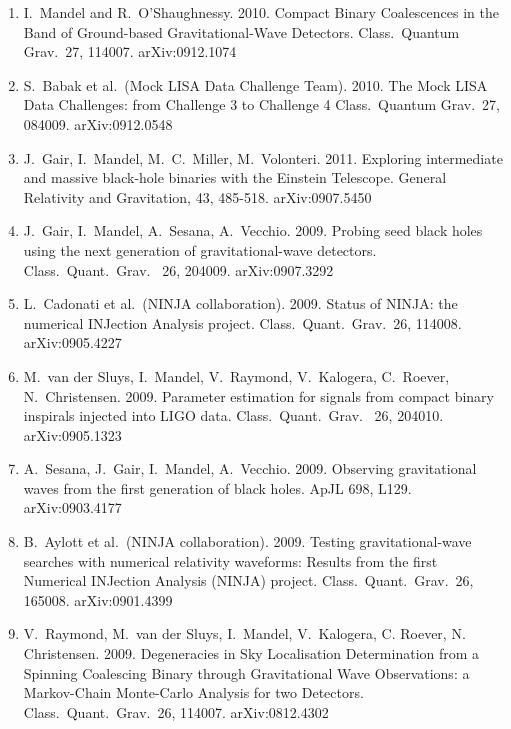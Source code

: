 \documentclass[margin,line]{res}
\begin{document}
\begin{resume}
\begin{enumerate}
\item  I.~Mandel and R.~O'Shaughnessy.  2010.  Compact Binary Coalescences in the Band of Ground-based Gravitational-Wave Detectors.  Class.~Quantum Grav.~27, 114007. arXiv:0912.1074  

\item  S.~Babak et al.~(Mock LISA Data Challenge Team). 2010.  The Mock LISA Data Challenges: from Challenge 3 to Challenge 4 Class.~Quantum Grav.~27, 084009.  arXiv:0912.0548  

\item  J.~Gair, I.~Mandel, M.~C.~Miller, M.~Volonteri.  2011.  Exploring intermediate and massive black-hole binaries with the Einstein Telescope. General Relativity and Gravitation, 43, 485-518.  arXiv:0907.5450

\item  J.~Gair, I.~Mandel, A.~Sesana, A.~Vecchio.  2009. Probing seed black holes using the next generation of gravitational-wave detectors.  Class.~Quant.~Grav.~ 26, 204009.  arXiv:0907.3292

\item  L.~Cadonati et al.~(NINJA collaboration). 2009. Status of NINJA: the numerical INJection Analysis project.  Class.~Quant.~Grav.~26, 114008. arXiv:0905.4227

\item  M.~van der Sluys, I.~Mandel, V.~Raymond, V.~Kalogera, C.~Roever, N.~Christensen. 2009. Parameter estimation for signals from compact binary inspirals injected into LIGO data.  Class.~Quant.~Grav.~ 26, 204010. arXiv:0905.1323

\item  A.~Sesana, J.~Gair, I.~Mandel, A.~Vecchio. 2009. Observing gravitational waves from the first generation of black holes.  ApJL 698, L129. arXiv:0903.4177 

\item  B.~Aylott et al.~(NINJA collaboration).  2009. Testing gravitational-wave searches with numerical relativity waveforms: Results from the first Numerical INJection Analysis (NINJA) project.  Class.~Quant.~Grav.~26, 165008.  arXiv:0901.4399

\item  V.~Raymond, M.~van der Sluys, I.~Mandel, V.~Kalogera, C. Roever, N. Christensen.  2009. Degeneracies in Sky Localisation Determination from a Spinning Coalescing Binary through Gravitational Wave Observations: a Markov-Chain Monte-Carlo Analysis for two Detectors. Class.~Quant.~Grav.~26, 114007.  arXiv:0812.4302


\end{enumerate}
\end{resume}
\end{document}
